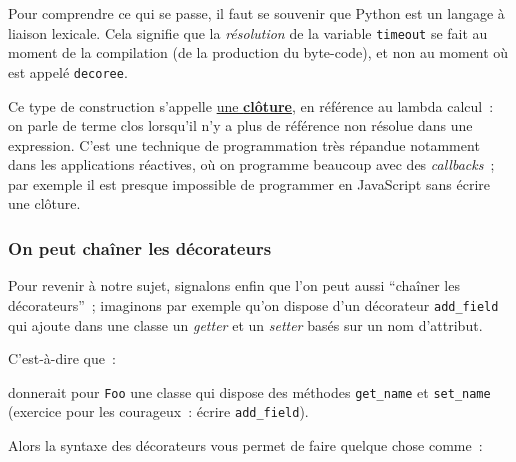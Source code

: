 Pour comprendre ce qui se passe, il faut se souvenir que Python est un
langage à liaison lexicale. Cela signifie que la \emph{résolution} de la
variable \texttt{timeout} se fait au moment de la compilation (de la
production du byte-code), et non au moment où est appelé
\texttt{decoree}.

Ce type de construction s'appelle
\href{http://fr.wikipedia.org/wiki/Fermeture_\%28informatique\%29}{une
\textbf{clôture}}, en référence au lambda calcul~: on parle de terme
clos lorsqu'il n'y a plus de référence non résolue dans une expression.
C'est une technique de programmation très répandue notamment dans les
applications réactives, où on programme beaucoup avec des
\emph{callbacks}~; par exemple il est presque impossible de programmer
en JavaScript sans écrire une clôture.

    \hypertarget{on-peut-chauxeener-les-duxe9corateurs}{%
\subsubsection{On peut chaîner les
décorateurs}\label{on-peut-chauxeener-les-duxe9corateurs}}

    Pour revenir à notre sujet, signalons enfin que l'on peut aussi
``chaîner les décorateurs''~; imaginons par exemple qu'on dispose d'un
décorateur \texttt{add\_field} qui ajoute dans une classe un
\emph{getter} et un \emph{setter} basés sur un nom d'attribut.

C'est-à-dire que~:

\begin{Shaded}
\begin{Highlighting}[]
\NormalTok{(}\NormalTok{)}
\end{Highlighting}
\end{Shaded}

donnerait pour \texttt{Foo} une classe qui dispose des méthodes
\texttt{get\_name} et \texttt{set\_name} (exercice pour les courageux~:
écrire \texttt{add\_field}).

    Alors la syntaxe des décorateurs vous permet de faire quelque chose
comme~:

\begin{Shaded}
\begin{Highlighting}[]
\NormalTok{(}\NormalTok{)}
\NormalTok{(}\NormalTok{)}
\end{Highlighting}
\end{Shaded}

